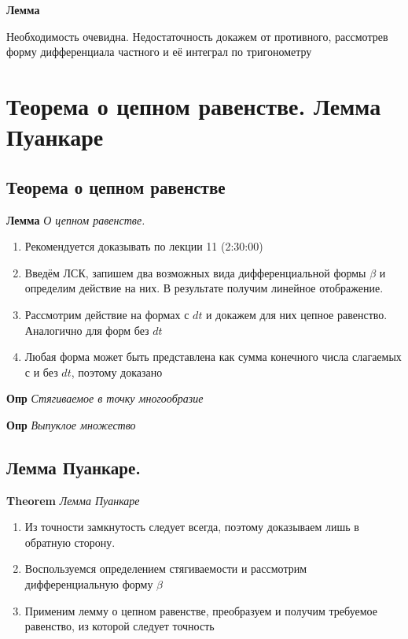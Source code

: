 \documentclass[a4paper, 14pt]{article}
\begin{document}
    \textbf{Лемма}
    
    Необходимость очевидна.
    Недостаточность докажем от противного, рассмотрев форму дифференциала частного и её интеграл по тригонометру
    
    \section{Теорема о цепном равенстве.
    Лемма Пуанкаре}
    
    \subsection{Теорема о цепном равенстве}
    
    \textbf{Лемма} \textit{О цепном равенстве.}
    
    \begin{enumerate}
        \item Рекомендуется доказывать по лекции 11 (2:30:00)
        \item Введём ЛСК, запишем два возможных вида дифференциальной формы $\beta$ и определим действие на них.
        В результате получим линейное отображение.
        \item Рассмотрим действие на формах с $dt$ и докажем для них цепное равенство.
        Аналогично для форм без $dt$
        \item Любая форма может быть представлена как сумма конечного числа слагаемых с и без $dt$, поэтому доказано
    \end{enumerate}
    
    \textbf{Опр} \textit{Стягиваемое в точку многообразие}
    
    \textbf{Опр} \textit{Выпуклое множество}
    
    \subsection{Лемма Пуанкаре.}
    
    \textbf{Theorem} \textit{Лемма Пуанкаре}
    
    \begin{enumerate}
        \item Из точности замкнутость следует всегда, поэтому доказываем лишь в обратную сторону.
        \item Воспользуемся определением стягиваемости и рассмотрим дифференциальную форму $\beta$
        \item Применим лемму о цепном равенстве, преобразуем и получим требуемое равенство, из которой следует точность
    \end{enumerate}
    
\end{document}
